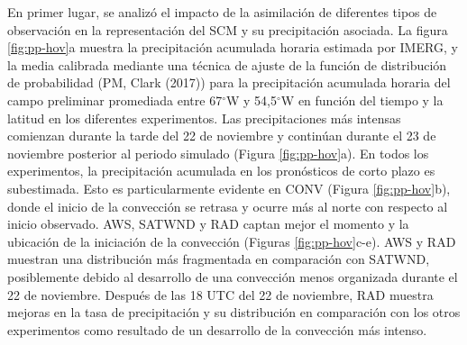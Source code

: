 \documentclass[12pt,oneside,a4paper]{reedthesis}
\begin{document}
En primer lugar, se analizó el impacto de la asimilación de diferentes tipos de observación en la representación del SCM y su precipitación asociada. La figura \ref{fig:pp-hov}a muestra la precipitación acumulada horaria estimada por IMERG, y la media calibrada mediante una técnica de ajuste de la función de distribución de probabilidad (PM, Clark (2017)) para la precipitación acumulada horaria del campo preliminar promediada entre 67\(^{\circ}\)W y 54,5\(^{\circ}\)W en función del tiempo y la latitud en los diferentes experimentos. Las precipitaciones más intensas comienzan durante la tarde del 22 de noviembre y continúan durante el 23 de noviembre posterior al periodo simulado (Figura \ref{fig:pp-hov}a). En todos los experimentos, la precipitación acumulada en los pronósticos de corto plazo es subestimada. Esto es particularmente evidente en CONV (Figura \ref{fig:pp-hov}b), donde el inicio de la convección se retrasa y ocurre más al norte con respecto al inicio observado. AWS, SATWND y RAD captan mejor el momento y la ubicación de la iniciación de la convección (Figuras \ref{fig:pp-hov}c-e). AWS y RAD muestran una distribución más fragmentada en comparación con SATWND, posiblemente debido al desarrollo de una convección menos organizada durante el 22 de noviembre. Después de las 18 UTC del 22 de noviembre, RAD muestra mejoras en la tasa de precipitación y su distribución en comparación con los otros experimentos como resultado de un desarrollo de la convección más intenso.
\end{document}
